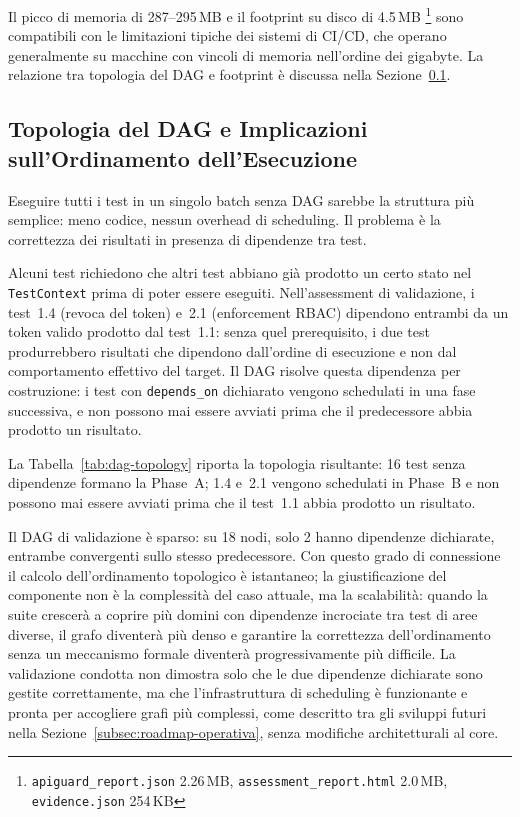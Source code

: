 Il picco di memoria di 287--295\,MB e il footprint su disco di 4.5\,MB \footnote{\texttt{apiguard\_report.json} 2.26\,MB, \texttt{assessment\_report.html} 2.0\,MB, \texttt{evidence.json} 254\,KB} sono compatibili con le limitazioni tipiche dei sistemi di \gls{CI/CD}, che operano generalmente su macchine con vincoli di memoria nell'ordine dei gigabyte. La relazione tra topologia del \gls{DAG} e footprint è discussa nella Sezione~\ref{subsec:topologia-dag}.


\subsection{Topologia del DAG e Implicazioni sull'Ordinamento dell'Esecuzione}\label{subsec:topologia-dag}

Eseguire tutti i test in un singolo batch senza \gls{DAG} sarebbe la struttura più semplice: meno codice, nessun overhead di scheduling. Il problema è la correttezza dei risultati in presenza di dipendenze tra test.

Alcuni test richiedono che altri test abbiano già prodotto un certo stato nel \texttt{TestContext} prima di poter essere eseguiti. Nell'assessment di validazione, i test~1.4 (revoca del token) e~2.1 (enforcement \gls{RBAC}) dipendono entrambi da un token valido prodotto dal test~1.1: senza quel prerequisito, i due test produrrebbero risultati che dipendono dall'ordine di esecuzione e non dal comportamento effettivo del target. Il \gls{DAG} risolve questa dipendenza per costruzione: i test con \texttt{depends\_on} dichiarato vengono schedulati in una fase successiva, e non possono mai essere avviati prima che il predecessore abbia prodotto un risultato.

La Tabella~\ref{tab:dag-topology} riporta la topologia risultante: 16 test senza dipendenze formano la Phase~A; 1.4 e~2.1 vengono schedulati in Phase~B e non possono mai essere avviati prima che il test~1.1 abbia prodotto un risultato.



Il \gls{DAG} di validazione è sparso: su 18 nodi, solo 2 hanno dipendenze dichiarate, entrambe convergenti sullo stesso predecessore. Con questo grado di connessione il calcolo dell'ordinamento topologico è istantaneo; la giustificazione del componente non è la complessità del caso attuale, ma la scalabilità: quando la suite crescerà a coprire più domini con dipendenze incrociate tra test di aree diverse, il grafo diventerà più denso e garantire la correttezza dell'ordinamento senza un meccanismo formale diventerà progressivamente più difficile. La validazione condotta non dimostra solo che le due dipendenze dichiarate sono gestite correttamente, ma che l'infrastruttura di scheduling è funzionante e pronta per accogliere grafi più complessi, come descritto tra gli sviluppi futuri nella Sezione~\ref{subsec:roadmap-operativa}, senza modifiche architetturali al core.

